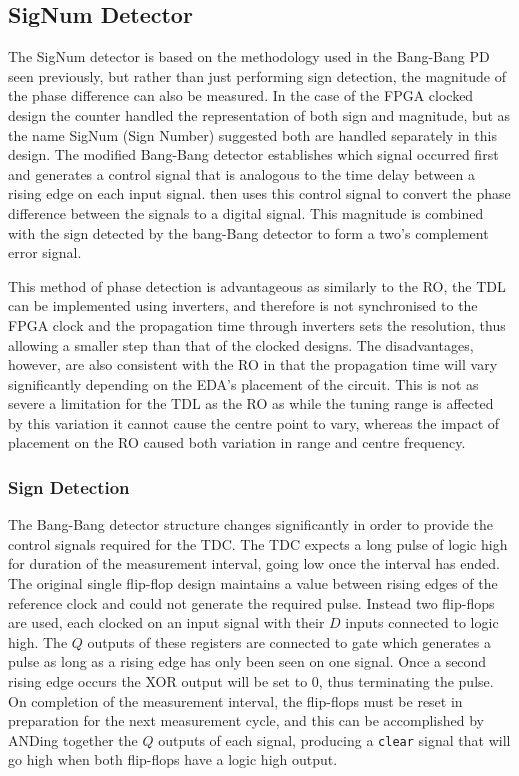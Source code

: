 \subsection{SigNum Detector}\label{section:signum}
The SigNum detector is based on the methodology used in the Bang-Bang \acl{PD} seen previously, but rather than just performing sign detection, the magnitude of the phase difference can also be measured. In the case of the \ac{FPGA} clocked design the counter handled the representation of both sign and magnitude, but as the name SigNum (Sign Number) suggested both are handled separately in this design. The modified Bang-Bang detector establishes which signal occurred first and generates a control signal that is analogous to the time delay between a rising edge on each input signal.  then uses this control signal to convert the phase difference between the signals to a digital signal. This magnitude is combined with the sign detected by the bang-Bang detector to form a two's complement error signal.

This method of phase detection is advantageous as similarly to the \acl{RO}, the \ac{TDL} can be implemented using inverters, and therefore is not synchronised to the \ac{FPGA} clock and the propagation time through inverters sets the resolution, thus allowing a smaller step than that of the clocked designs. The disadvantages, however, are also consistent with the \ac{RO} in that the propagation time will vary significantly depending on the \ac{EDA}'s placement of the circuit. This is not as severe a limitation for the \ac{TDL} as the \ac{RO} as while the tuning range is affected by this variation it cannot cause the centre point to vary, whereas the impact of placement on the \ac{RO} caused both variation in range and centre frequency.


\subsubsection{Sign Detection}
The Bang-Bang detector structure changes significantly in order to provide the control signals required for the \ac{TDC}. The \ac{TDC} expects a long pulse of logic high for duration of the measurement interval, going low once the interval has ended. The original single flip-flop design maintains a value between rising edges of the reference clock and could not generate the required pulse. Instead two flip-flops are used, each clocked on an input signal with their $D$ inputs connected to logic high. The $Q$ outputs of these registers are connected to  gate which generates a pulse as long as a rising edge has only been seen on one signal. Once a second rising edge occurs the \acs{XOR} output will be set to 0, thus terminating the pulse. On completion of the measurement interval, the flip-flops must be reset in preparation for the next measurement cycle, and this can be accomplished by ANDing together the $Q$ outputs of each signal, producing a \texttt{clear} signal that will go high when both flip-flops have a logic high output.

